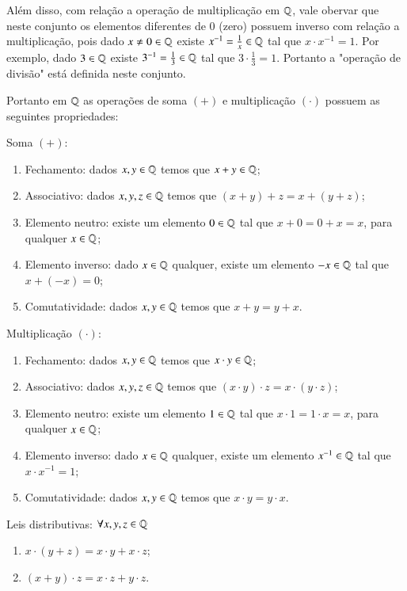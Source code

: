  Além disso, com relação a operação de multiplicação em $\mathbb{Q}$, vale obervar que neste conjunto os elementos diferentes de $0$ (zero) possuem inverso com relação a multiplicação, pois dado $x \neq 0 \in \mathbb{Q}$ existe $x^{-1}= \frac{1}{x} \in \mathbb{Q}$ tal que $x \cdot x^{-1}= 1$. Por exemplo, dado $3 \in \mathbb{Q}$ existe $3^{-1}= \frac{1}{3} \in \mathbb{Q}$ tal que $3 \cdot \frac{1}{3}= 1$. Portanto a "operação de divisão" está definida neste conjunto.
 
   \vskip0.3cm
 
 Portanto em $\mathbb{Q}$ as operações de soma $(+)$ e multiplicação $(\cdot)$ possuem as seguintes propriedades:
 
 Soma $(+)$:
 \begin{enumerate}[1)]
 \item Fechamento: dados $x, y \in \mathbb{Q}$ temos que $x+y \in \mathbb{Q}$;
 \item Associativo: dados $x, y, z \in \mathbb{Q}$ temos que $(x+y)+z= x+(y+z)$;
 \item Elemento neutro: existe um elemento $0 \in \mathbb{Q}$ tal que $x+0=0+x=x$, para qualquer $x \in \mathbb{Q}$;
 \item Elemento inverso: dado $x \in \mathbb{Q}$ qualquer, existe um elemento $-x \in \mathbb{Q}$ tal que $x+(-x)=0$;
 \item Comutatividade: dados $x, y \in \mathbb{Q}$ temos que $x+y= y+x$. 
 \end{enumerate}
 
  Multiplicação $(\cdot)$:
 \begin{enumerate}[1)]
 \item Fechamento: dados $x, y \in \mathbb{Q}$ temos que $x \cdot y \in \mathbb{Q}$;
 \item Associativo: dados $x, y, z \in \mathbb{Q}$ temos que $(x \cdot y) \cdot z= x \cdot (y \cdot z)$;
 \item Elemento neutro: existe um elemento $1 \in \mathbb{Q}$ tal que $x \cdot 1= 1 \cdot x= x$, para qualquer $x \in \mathbb{Q}$;
 \item Elemento inverso: dado $x \in \mathbb{Q}$ qualquer, existe um elemento $x^{-1} \in \mathbb{Q}$ tal que $x \cdot x^{-1}= 1$;
 \item Comutatividade: dados $x, y \in \mathbb{Q}$ temos que $x \cdot y= y \cdot x$. 
 \end{enumerate}
 
  Leis distributivas: $\forall x, y, z \in \mathbb{Q}$
 \begin{enumerate}[1)]
 \item $x \cdot (y + z)= x \cdot y + x \cdot z$;
 \item $(x + y) \cdot z= x \cdot z + y \cdot z$.
 \end{enumerate}
 
